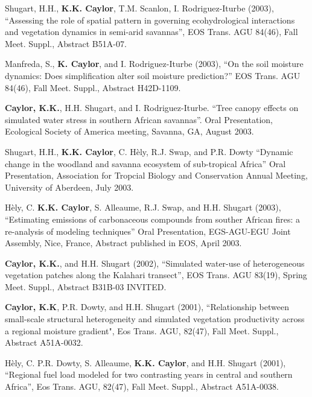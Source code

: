 \documentclass[10pt]{article}
\begin{document}
\begin{etaremune}
\item Shugart, H.H., \textbf{K.K. Caylor}, T.M. Scanlon, I. Rodriguez-Iturbe (2003),  ``Assessing the role of spatial pattern in governing ecohydrological interactions and vegetation dynamics in semi-arid savannas'', EOS Trans. AGU 84(46), Fall Meet. Suppl., Abstract B51A-07.

\item Manfreda, S., \textbf{K. Caylor}, and I. Rodriguez-Iturbe (2003), ``On the soil moisture dynamics: Does simplification alter soil moisture prediction?'' EOS Trans. AGU 84(46), Fall Meet. Suppl., Abstract H42D-1109.

\item \textbf{Caylor, K.K.}, H.H. Shugart, and I. Rodriguez-Iturbe. ``Tree canopy effects on simulated water stress in southern African savannas''. Oral Presentation, Ecological Society of America meeting, Savanna, GA, August 2003.

\item Shugart, H.H., \textbf{K.K. Caylor}, C. H\`ely, R.J. Swap, and P.R. Dowty ``Dynamic change in the woodland and savanna ecosystem of sub-tropical Africa'' Oral Presentation, Association for Tropcial Biology and Conservation Annual Meeting, University of Aberdeen, July 2003.

\item H\`ely, C. \textbf{K.K. Caylor}, S. Alleaume, R.J. Swap, and H.H. Shugart (2003), ``Estimating emissions of carbonaceous compounds from souther African fires: a re-analysis of modeling techniques'' Oral Presentation, EGS-AGU-EGU Joint Assembly, Nice, France, Abstract published in EOS, April 2003.

\item \textbf{Caylor, K.K.}, and H.H. Shugart (2002), ``Simulated water-use of heterogeneous vegetation patches along the Kalahari transect'', EOS Trans. AGU 83(19), Spring Meet. Suppl., Abstract B31B-03 INVITED.

\item \textbf{Caylor, K.K}, P.R. Dowty, and H.H. Shugart (2001), ``Relationship between small-scale structural heterogeneity and simulated vegetation productivity across a regional moisture gradient", Eos Trans. AGU, 82(47), Fall Meet. Suppl., Abstract A51A-0032.

\item H\`ely, C. P.R. Dowty, S. Alleaume, \textbf{K.K. Caylor}, and H.H. Shugart (2001), ``Regional fuel load modeled for two contrasting years in central and southern Africa'', Eos Trans. AGU, 82(47), Fall Meet. Suppl., Abstract A51A-0038.


\end{etaremune}
\end{document}
